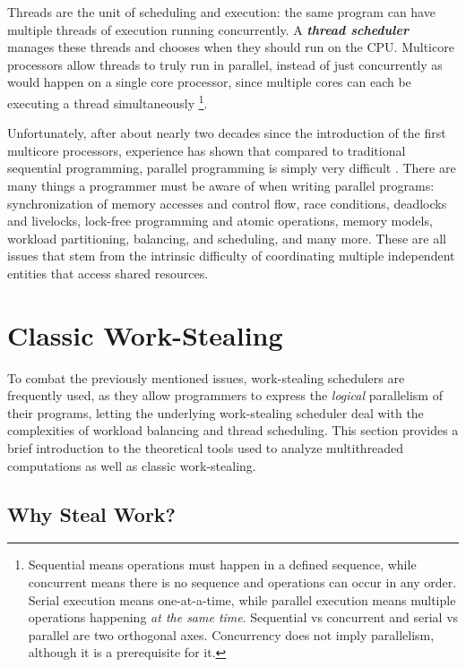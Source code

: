 \documentclass[bsc,frontabs,singlespacing,parskip,deptreport,normalheadings]{infthesis}
\begin{document}
Threads are the unit of scheduling and execution: the same
program can have multiple threads of execution running concurrently. A
\textit{\textbf{thread scheduler}} manages these threads and chooses when they
should run on the CPU. Multicore processors allow threads to truly run in
parallel, instead of just concurrently as would happen on a single core
processor, since multiple cores can each be executing a thread simultaneously
\footnote{Sequential means operations must happen in a defined sequence, while
    concurrent means there is no sequence and operations can occur in any order.
    Serial execution means one-at-a-time, while parallel execution means
    multiple operations happening \textit{at the same time}. Sequential vs
concurrent and serial vs parallel are two orthogonal axes. Concurrency does not
imply parallelism, although it is a prerequisite for it.}.

Unfortunately, after about nearly two decades since the introduction of the
first multicore processors, experience has shown that compared to traditional
sequential programming, parallel programming is simply very difficult
\cite{creeger_multicore_2005, lee_problem_2006, patterson_trouble_2010}. There
are many things a programmer must be aware of when writing parallel programs:
synchronization of memory accesses and control flow, race conditions,
deadlocks and livelocks, lock-free programming and atomic operations, memory
models, workload partitioning, balancing, and scheduling, and many more. These
are all issues that stem from the intrinsic difficulty of coordinating multiple
independent entities that access shared resources.

\section{Classic Work-Stealing}
\label{section:classic_work-stealing}

To combat the previously mentioned issues, work-stealing schedulers are
frequently used, as they allow programmers to express the \textit{logical}
parallelism of their programs, letting the underlying work-stealing scheduler
deal with the complexities of workload balancing and thread scheduling. This
section provides a brief introduction to the theoretical tools used to analyze
multithreaded computations as well as classic work-stealing.

\subsection{Why Steal Work?}
\end{document}
